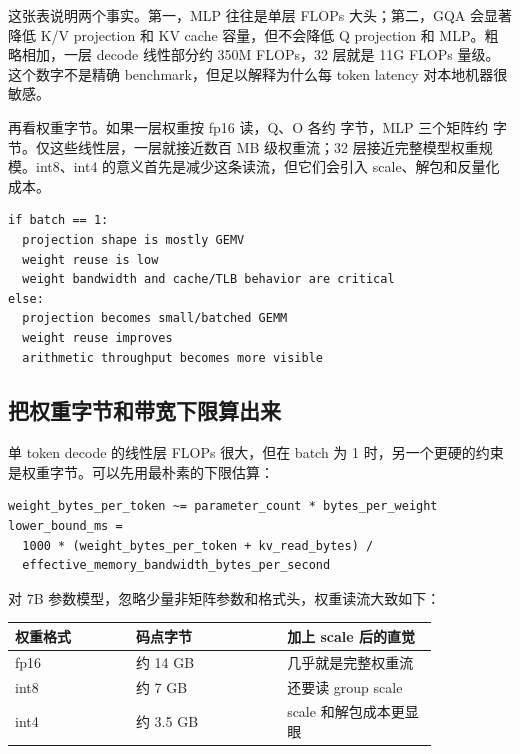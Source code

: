 这张表说明两个事实。第一，MLP 往往是单层 FLOPs 大头；第二，GQA 会显著降低 K/V projection 和 KV cache 容量，但不会降低 Q projection 和 MLP。粗略相加，一层 decode 线性部分约 350M FLOPs，32 层就是 11G FLOPs 量级。这个数字不是精确 benchmark，但足以解释为什么每 token latency 对本地机器很敏感。

再看权重字节。如果一层权重按 fp16 读，Q、O 各约  字节，MLP 三个矩阵约  字节。仅这些线性层，一层就接近数百 MB 级权重流；32 层接近完整模型权重规模。int8、int4 的意义首先是减少这条读流，但它们会引入 scale、解包和反量化成本。

\begin{lstlisting}[numbers=none,caption={单 token decode 的粗略机器判断}]
if batch == 1:
  projection shape is mostly GEMV
  weight reuse is low
  weight bandwidth and cache/TLB behavior are critical
else:
  projection becomes small/batched GEMM
  weight reuse improves
  arithmetic throughput becomes more visible
\end{lstlisting}

\subsection{把权重字节和带宽下限算出来}

单 token decode 的线性层 FLOPs 很大，但在 batch 为 1 时，另一个更硬的约束是权重字节。可以先用最朴素的下限估算：

\begin{lstlisting}[numbers=none,caption={单 token decode 的字节下限}]
weight_bytes_per_token ~= parameter_count * bytes_per_weight
lower_bound_ms =
  1000 * (weight_bytes_per_token + kv_read_bytes) /
  effective_memory_bandwidth_bytes_per_second
\end{lstlisting}

对 7B 参数模型，忽略少量非矩阵参数和格式头，权重读流大致如下：

\begin{center}
\begin{tabular}{p{0.24\linewidth}p{0.30\linewidth}p{0.30\linewidth}}
\toprule
权重格式 & 码点字节 & 加上 scale 后的直觉 \\
\midrule
fp16 & 约 14 GB & 几乎就是完整权重流 \\
int8 & 约 7 GB & 还要读 group scale \\
int4 & 约 3.5 GB & scale 和解包成本更显眼 \\
\bottomrule
\end{tabular}
\end{center}

